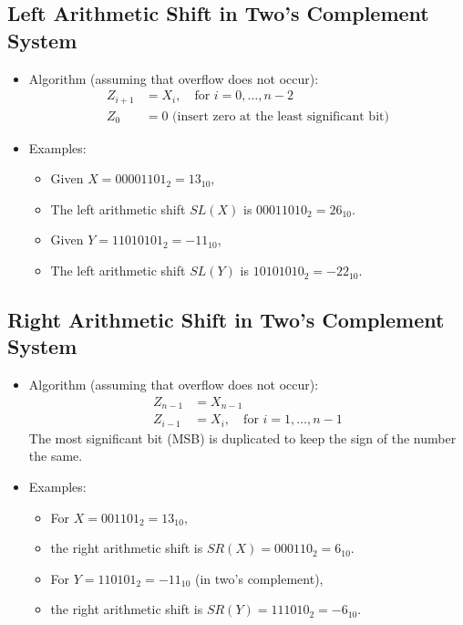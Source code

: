 \documentclass[12pt,openany, tikz,border=10pt]{book}
\begin{document}
	\newpage
	\subsection{Left Arithmetic Shift in Two's Complement System}
	
	\begin{itemize}
		\item[] Algorithm (assuming that overflow does not occur):
			  \begin{align*}
				  Z_{i+1} & = X_{i}, \quad \text{for } i = 0, \ldots, n-2          \\
				  Z_{0}   & = 0 \text{ (insert zero at the least significant bit)} 
			  \end{align*}
		\item[] Examples:
			  \begin{itemize}
				  \item[] Given \( X = 00001101_2 = 13_{10} \),
				  \item[] The left arithmetic shift \( SL(X) \) is \(00011010_2 = 26_{10} \).
				  \item[] Given \( Y = 11010101_2 = -11_{10} \),
				  \item[] The left arithmetic shift \( SL(Y) \) is \( 10101010_2 = -22_{10} \).
			  \end{itemize}
	\end{itemize}
	
	
	
	
	\subsection{Right Arithmetic Shift in Two's Complement System}
	
	
	\begin{itemize}
		\item[] Algorithm (assuming that overflow does not occur):
		      \begin{align*}
		      	Z_{n-1} & = X_{n-1}                                   \\
		      	Z_{i-1} & = X_i, \quad \text{for } i = 1, \ldots, n-1 
		      \end{align*}
		      The most significant bit (MSB) is duplicated to keep the sign of the number the same.
		\item[] Examples:
		      \begin{itemize}
		      	\item[] For $X = 001101_2 = 13_{10}$,
				\item[] the right arithmetic shift is $SR(X) = 000110_2 = 6_{10}$.
		      	\item[] For $Y = 110101_2 = -11_{10}$ (in two's complement),
				\item[] the right arithmetic shift is $SR(Y) = 111010_2 = -6_{10}$.
		      \end{itemize}
	\end{itemize}
	
\end{document}
